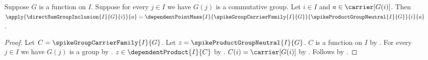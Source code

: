 \begin{proposition}\label{spike_direct_sum_group_inclusion_apply}
    Suppose $G$ is a function on $I$.
    Suppose for every $j\in I$ we have $G(j)$ is a commutative group.
    Let $i\in I$ and $a\in\carrier[G(i)]$.
    Then
        $\apply{\directSumGroupInclusion{I}{G}{i}}{a}
            =\dependentPointMass
                {I}{\spikeGroupCarrierFamily{I}{G}}{
                    \spikeProductGroupNeutral{I}{G}}{i}{a}$.
\end{proposition}
\begin{proof}
    Let $C=\spikeGroupCarrierFamily{I}{G}$.
    Let $z=\spikeProductGroupNeutral{I}{G}$.
    $C$ is a function on $I$ by
        .
    For every $j\in I$ we have $G(j)$ is a group by
        .
    $z\in\dependentProduct{I}{C}$ by
        .
    $C(i)=\carrier[G(i)]$ by
        .
    Follows by
        .
\end{proof}

